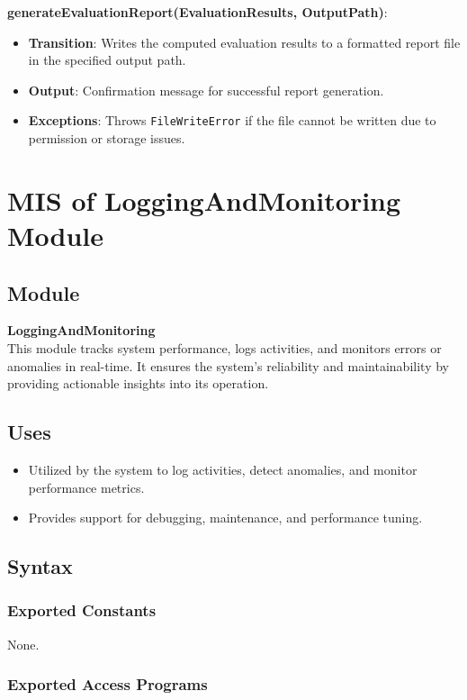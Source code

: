 \documentclass[12pt, titlepage]{article}
\begin{document}
\textbf{generateEvaluationReport(EvaluationResults, OutputPath)}:
\begin{itemize}
    \item \textbf{Transition}: Writes the computed evaluation results to a formatted report file in the specified output path.
    \item \textbf{Output}: Confirmation message for successful report generation.
    \item \textbf{Exceptions}: Throws \texttt{FileWriteError} if the file cannot be written due to permission or storage issues.
\end{itemize}

\newpage
\section{MIS of LoggingAndMonitoring Module}

\subsection{Module}
\textbf{LoggingAndMonitoring} \\
This module tracks system performance, logs activities, and monitors errors or anomalies in real-time. It ensures the system's reliability and maintainability by providing actionable insights into its operation.

\subsection{Uses}
\begin{itemize}
    \item Utilized by the system to log activities, detect anomalies, and monitor performance metrics.
    \item Provides support for debugging, maintenance, and performance tuning.
\end{itemize}

\subsection{Syntax}

\subsubsection{Exported Constants}
None.

\subsubsection{Exported Access Programs}
\end{document}

